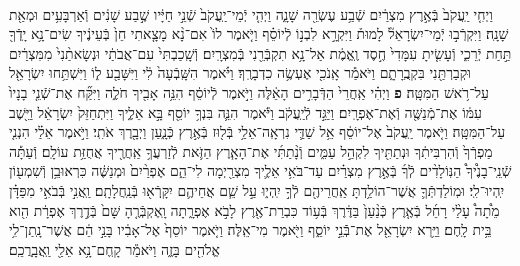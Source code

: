\documentclass[twoside, openany, parskip=half, 11pt]{book}
\begin{document}
\begin{sometimes}
\begin{footnotesize}
\begin{multicols}{2}
\\
וַיְחִ֤י יַֽעֲקֹב֙ בְּֿאֶ֣רֶץ מִצְרַ֔יִם שְֿׁבַ֥ע עֶשְׂרֵ֖ה שָׁנָ֑ה וַיְהִ֤י יְֿמֵי־יַֽעֲקֹב֙ שְֿׁנֵ֣י חַיָּ֔יו שֶׁ֣בַע שָׁנִ֔ים וְֿאַרְבָּעִ֥ים וּמְאַ֖ת שָׁנָֽה׃ וַיִּקְרְֿב֣וּ יְֿמֵי־יִשְׂרָאֵל֘ לָמוּת֒ וַיִּקְרָ֣א לִבְנ֣וֹ לְֿיוֹסֵ֗ף וַיֹּ֤אמֶר לוֹ֙ אִם־נָ֨א מָצָ֤אתִי חֵן֙ בְּֿעֵינֶ֔יךָ שִׂים־נָ֥א יָֽדְֿךָ֖ תַּ֣חַת יְֿרֵכִ֑י וְֿעָשִׂ֤יתָ עִמָּדִי֙ חֶ֣סֶד וֶֽאֱמֶ֔ת אַל־נָ֥א תִקְבְּֿרֵ֖נִי בְּֿמִצְרָֽיִם׃ וְֿשָֽׁכַבְתִּי֙ עִם־אֲבֹתַ֔י וּנְשָׂאתַ֨נִי֙ מִמִּצְרַ֔יִם וּקְבַרְתַּ֖נִי בִּקְבֻֽרָתָ֑ם וַיֹּאמַ֕ר אָֽנֹכִ֖י אֶעְשֶׂ֥ה כִדְבָרֶֽךָ׃ וַיֹּ֗אמֶר הִשָּֽׁבְֿעָה֙ לִ֔י וַיִּשָּׁבַ֖ע ל֑וֹ וַיִּשְׁתַּ֥חוּ יִשְׂרָאֵ֖ל עַל־רֹ֥אשׁ הַמִּטָּֽה׃ \textbf{פ}
וַיְהִ֗י אַֽחֲרֵי֙ הַדְּֿבָרִ֣ים הָאֵ֔לֶּה וַיֹּ֣אמֶר לְֿיוֹסֵ֔ף הִנֵּ֥ה אָבִ֖יךָ חֹלֶ֑ה וַיִּקַּ֞ח אֶת־שְֿׁנֵ֤י בָנָיו֙ עִמּ֔וֹ אֶת־מְֿנַשֶּׁ֖ה וְֿאֶת־אֶפְרָֽיִם׃ וַיַּגֵּ֣ד לְֿיַֽעֲקֹ֔ב וַיֹּ֕אמֶר הִנֵּ֛ה בִּנְךָ֥ יוֹסֵ֖ף בָּ֣א אֵלֶ֑יךָ וַיִּתְחַזֵּק֙ יִשְׂרָאֵ֔ל וַיֵּ֖שֶׁב עַל־הַמִּטָּֽה׃ וַיֹּ֤אמֶר יַֽעֲקֹב֙ אֶל־יוֹסֵ֔ף אֵ֥ל שַׁדַּ֛י נִרְאָֽה־אֵלַ֥י בְּֿל֖וּז בְּֿאֶ֣רֶץ כְּֿנָ֑עַן וַיְבָ֖רֶךְ אֹתִֽי׃  וַיֹּ֣אמֶר אֵלַ֗י הִנְנִ֤י מַפְרְֿךָ֙ וְֿהִרְבִּיתִ֔ךָ וּנְתַתִּ֖יךָ לִקְהַ֣ל עַמִּ֑ים וְֿנָ֨תַתִּ֜י אֶת־הָאָ֧רֶץ הַזֹּ֛את לְֿזַרְעֲךָ֥ אַֽחֲרֶ֖יךָ אֲחֻזַּ֥ת עוֹלָֽם׃ וְֿעַתָּ֡ה שְֿׁנֵֽי־בָנֶ֩יךָ֩ הַנּֽוֹלָדִ֨ים לְֿךָ֜ בְּֿאֶ֣רֶץ מִצְרַ֗יִם עַד־בֹּאִ֥י אֵלֶ֛יךָ מִצְרַ֖יְמָה לִי־הֵ֑ם אֶפְרַ֨יִם֙ וּמְנַשֶּׁ֔ה כִּרְאוּבֵ֥ן וְֿשִׁמְע֖וֹן יִֽהְיוּ־לִֽי׃ וּמֽוֹלַדְתְּֿךָ֛ אֲשֶׁר־הוֹלַ֥דְתָּ אַֽחֲרֵיהֶ֖ם לְֿךָ֣ יִֽהְי֑וּ עַ֣ל שֵׁ֧ם אֲחֵיהֶ֛ם יִקָּֽרְֿא֖וּ בְּֿנַֽחֲלָתָֽם׃ וַֽאֲנִ֣י בְּֿבֹאִ֣י מִפַּדָּ֗ן מֵ֩תָה֩ עָלַ֨י רָחֵ֜ל בְּֿאֶ֤רֶץ כְּֿנַ֨עַן֙ בַּדֶּ֔רֶךְ בְּֿע֥וֹד כִּבְרַת־אֶ֖רֶץ לָבֹ֣א אֶפְרָ֑תָה וָֽאֶקְבְּֿרֶ֤הָ שָּׁם֙ בְּֿדֶ֣רֶךְ אֶפְרָ֔ת הִ֖וא בֵּ֥ית לָֽחֶם׃ וַיַּ֥רְא יִשְׂרָאֵ֖ל אֶת־בְּֿֿנֵ֣י יוֹסֵ֑ף וַיֹּ֖אמֶר מִי־אֵֽלֶּה׃ וַיֹּ֤אמֶר יוֹסֵף֙ אֶל־אָבִ֔יו בָּנַ֣י הֵ֔ם אֲשֶׁר־נָֽתַן־לִ֥י אֱלֹהִ֖ים בָּזֶ֑ה וַיֹּאמַ֕ר קָֽחֶם־נָ֥א אֵלַ֖י וַֽאֲבָֽרֲכֵֽם׃


\end{multicols}
\end{footnotesize}
\end{sometimes}
\end{document}
